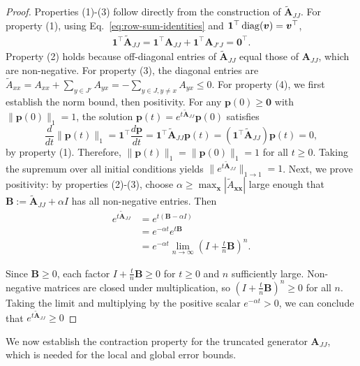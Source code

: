 \documentclass[onefignum,onetabnum]{siamart171218}
\begin{document}
\begin{proof}
Properties (1)-(3) follow directly from the construction of $\widetilde{\mathbf{A}}_{JJ}$. For property (1), using Eq.~\eqref{eq:row-sum-identities} and $\mathbf{1}^\top \operatorname{diag}(\boldsymbol{v}) = \boldsymbol{v}^\top$,
\begin{align*}
\mathbf{1}^\top \widetilde{\mathbf{A}}_{JJ} = \mathbf{1}^\top \mathbf{A}_{JJ} + \mathbf{1}^\top \mathbf{A}_{J'J} = \mathbf{0}^\top.
\end{align*}
Property (2) holds because off-diagonal entries of $\widetilde{\mathbf{A}}_{JJ}$ equal those of $\mathbf{A}_{JJ}$, which are non-negative. For property (3), the diagonal entries are $\widetilde{A}_{xx} = A_{xx} + \sum_{y \in J'} A_{yx} = - \sum_{y \in J, y \neq x} A_{yx} \leq 0$. For property (4), we first establish the norm bound, then positivity. For any $\boldsymbol{p}(0) \geq \mathbf{0}$ with $\|\boldsymbol{p}(0)\|_1 = 1$, the solution $\boldsymbol{p}(t) = e^{t\widetilde{\mathbf{A}}_{JJ}}\boldsymbol{p}(0)$ satisfies
\begin{equation}
\frac{d}{dt}\|\boldsymbol{p}(t)\|_1 = \mathbf{1}^\top \frac{d\boldsymbol{p}}{dt} = \mathbf{1}^\top \widetilde{\mathbf{A}}_{JJ}\boldsymbol{p}(t) = (\mathbf{1}^\top \widetilde{\mathbf{A}}_{JJ})\boldsymbol{p}(t) = 0,
\end{equation}
by property (1). Therefore, $\|\boldsymbol{p}(t)\|_1 = \|\boldsymbol{p}(0)\|_1 = 1$ for all $t \geq 0$. Taking the supremum over all initial conditions yields $\|e^{t\widetilde{\mathbf{A}}_{JJ}}\|_{1 \to 1} = 1$. Next, we prove positivity: by properties (2)-(3), choose $\alpha \geq \max_{\boldsymbol{x}} |\widetilde{A}_{\boldsymbol{x}\boldsymbol{x}}|$ large enough that $\mathbf{B} := \widetilde{\mathbf{A}}_{JJ} + \alpha I$ has all non-negative entries. Then
\begin{align*}
e^{t\widetilde{\mathbf{A}}_{JJ}} &= e^{t(\mathbf{B} - \alpha I)} \\
                        &= e^{-\alpha t} e^{t\mathbf{B}} \\
                        &= e^{-\alpha t} \lim_{n \to \infty} \left(I + \frac{t}{n}\mathbf{B}\right)^n.
\end{align*}

Since $\mathbf{B} \geq 0$, each factor $I + \frac{t}{n}\mathbf{B} \geq 0$ for $t \geq 0$ and $n$ sufficiently large. Non-negative matrices are closed under multiplication, so $(I + \frac{t}{n}\mathbf{B})^n \geq 0$ for all $n$. Taking the limit and multiplying by the positive scalar $e^{-\alpha t} > 0$, we can conclude that $e^{t\widetilde{\mathbf{A}}_{JJ}} \geq 0$
\end{proof}
We now establish the contraction property for the truncated generator $\mathbf{A}_{JJ}$, which is needed for the local and global error bounds.
\end{document}
